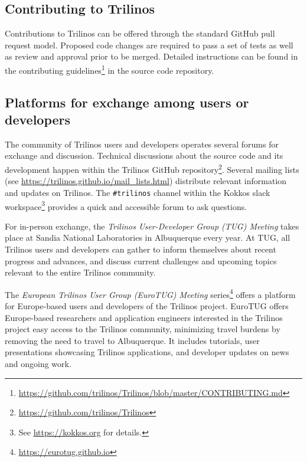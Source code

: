 
\subsection{Contributing to Trilinos}

Contributions to Trilinos can be offered through the standard GitHub pull request model. Proposed code changes are required to pass a set of tests as well as review and approval prior to be merged. Detailed instructions can be found in the contributing guidelines\footnote{\url{https://github.com/trilinos/Trilinos/blob/master/CONTRIBUTING.md}} in the source code repository.

\subsection{Platforms for exchange among users or developers}

The community of Trilinos users and developers operates several forums for exchange and discussion. Technical discussions about the source code and its development happen within the Trilinos GitHub repository\footnote{\url{https://github.com/trilinos/Trilinos}}.
Several mailing lists (see \url{https://trilinos.github.io/mail_lists.html}) distribute relevant information and updates on Trilinos.
The \texttt{\#trilinos} channel within the Kokkos slack workspace\footnote{See \url{https://kokkos.org} for details.} provides a quick and accessible forum to ask questions.

For in-person exchange, the \emph{Trilinos User-Developer Group (TUG) Meeting} takes place at Sandia National Laboratories in Albuquerque every year. At TUG, all Trilinos users and developers can gather to inform themselves about recent progress and advances, and discuss current challenges and upcoming topics relevant to the entire Trilinos community.

The \emph{European Trilinos User Group (EuroTUG) Meeting} series\footnote{\url{https://eurotug.github.io}}
offers a platform for Europe-based users and developers of the Trilinos project.
EuroTUG offers Europe-based researchers and application engineers interested in the Trilinos project easy access to the Trilinos community, minimizing travel burdens by removing the need to travel to Albuquerque.
It includes tutorials, user presentations showcasing Trilinos applications, and developer updates on news and ongoing work.

